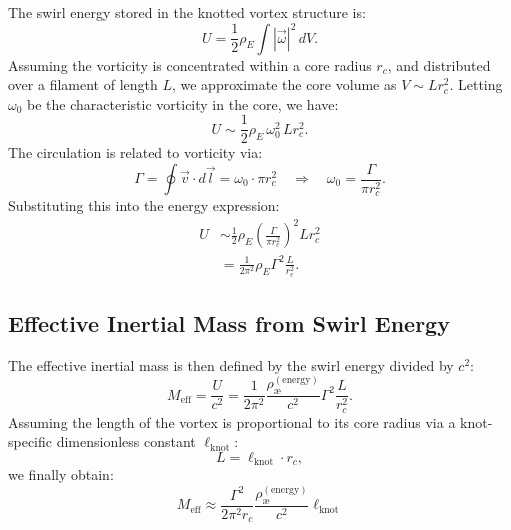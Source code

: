 \documentclass[12pt]{article}
\begin{document}
  The swirl energy stored in the knotted vortex structure is:
  \begin{equation}
    U = \frac{1}{2} \rho_{\scriptscriptstyle\boldsymbol\!E}\int |\vec{\omega}|^2 \, dV.
  \end{equation}
  Assuming the vorticity is concentrated within a core radius $r_c$, and distributed over a filament of length $L$, we approximate the core volume as $V \sim L r_c^2$. Letting $\omega_0$ be the characteristic vorticity in the core, we have:
  \begin{equation}
    U \sim \frac{1}{2} \rho_{\scriptscriptstyle\boldsymbol\!E}\, \omega_0^2 \, L r_c^2.
  \end{equation}
  The circulation is related to vorticity via:
  \begin{equation}
    \Gamma = \oint \vec{v} \cdot d\vec{l} = \omega_0 \cdot \pi r_c^2 \quad \Rightarrow \quad \omega_0 = \frac{\Gamma}{\pi r_c^2}.
  \end{equation}
  Substituting this into the energy expression:
  \begin{align}
    U &\sim \frac{1}{2} \rho_{\scriptscriptstyle\boldsymbol\!E}\left( \frac{\Gamma}{\pi r_c^2} \right)^2 L r_c^2 \\
    &= \frac{1}{2\pi^2} \rho_{\scriptscriptstyle\boldsymbol\!E}\Gamma^2 \frac{L}{r_c^2}.
  \end{align}

  \subsection{Effective Inertial Mass from Swirl Energy}

  The effective inertial mass is then defined by the swirl energy divided by $c^2$:
  \begin{equation}
    M_\text{eff} = \frac{U}{c^2} = \frac{1}{2\pi^2} \frac{\rho_\text{\ae}^{(\text{energy})}}{c^2} \Gamma^2 \frac{L}{r_c^2}.
  \end{equation}
  Assuming the length of the vortex is proportional to its core radius via a knot-specific dimensionless constant $\ell_\text{knot}$:
  \begin{equation}
    L = \ell_\text{knot} \cdot r_c,
  \end{equation}
  we finally obtain:
  \begin{equation}
    \boxed{
      M_\text{eff} \approx \frac{\Gamma^2}{2\pi^2 r_c} \frac{\rho_\text{\ae}^{(\text{energy})}}{c^2} \ell_\text{knot}
    }
  \end{equation}
\end{document}
